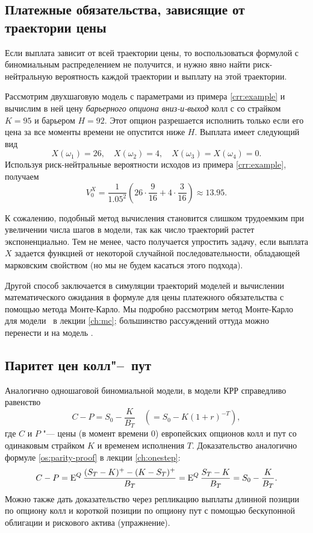 \subsection{Платежные обязательства, зависящие от траектории цены}
Если выплата зависит от всей траектории цены, то воспользоваться формулой с биномиальным распределением не получится, и нужно явно найти риск-нейтральную вероятность каждой траектории и выплату на этой траектории.

\begin{example}
\label{crr:e:barrier}
Рассмотрим двухшаговую модель с параметрами из примера \ref{crr:example} и вычислим в ней цену \emph{барьерного опциона вниз-и-выход} колл с со страйком $K=95$ и барьером $H=92$. Этот опцион разрешается исполнить только если его цена за все моменты времени не опустится ниже $H$.
Выплата имеет следующий вид
\[
X(\omega_1) = 26, \quad X(\omega_2) = 4, \quad X(\omega_3) = X(\omega_4)=0.
\]
Используя риск-нейтральные вероятности исходов из примера \ref{crr:example}, получаем
\[
V_0^X = \frac1{1.05^2}\left(26 \cdot \frac9{16} + 4\cdot \frac3{16}\right) \approx 13.95.
\]
\end{example}

\begin{remark}
К сожалению, подобный метод вычисления становится слишком трудоемким при увеличении числа шагов в модели, так как число траекторий растет экспоненциально.
Тем не менее, часто получается упростить задачу, если выплата $X$ задается функцией от некоторой  случайной последовательности, обладающей марковским свойством (но мы не будем касаться этого подхода). 

Другой способ заключается в симуляции траекторий моделей и вычислении математического ожидания в формуле для цены платежного обязательства с помощью метода Монте-Карло.
Мы подробно рассмотрим метод Монте-Карло для модели \bs\ в лекции \ref{ch:mc}; большинство рассуждений оттуда можно перенести и на модель \crr.
\end{remark}

\subsection{Паритет цен колл"--~пут}
Аналогично одношаговой биномиальной модели, в модели КРР справедливо равенство 
\[
C-P = S_0 - \frac{K}{B_T} \quad (= S_0 - K(1+r)^{-T}),
\]
где $C$ и $P$ "--- цены (в момент времени 0) европейских опционов колл и пут со одинаковым страйком $K$ и временем исполнения $T$.
Доказательство аналогично формуле \eqref{os:parity-proof} в лекции \ref{ch:onestep}:
\[
C - P = \operatorname{E}^Q \frac{(S_T-K)^+ - (K-S_T)^+ }{B_T}
= \operatorname{E}^Q \frac{S_T - K}{B_T} = S_0 - \frac{K}{B_T}.
\]
Можно также дать доказательство через репликацию выплаты длинной позиции по опциону колл и короткой позиции по опциону пут с помощью бескупонной облигации и рискового актива (упражнение). 


